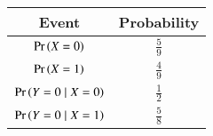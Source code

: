 
\begin{center}
    \begin{tabular}{|c|c|}
    \hline
    \textbf{Event}& \textbf{Probability} \\ \hline
    $\Pr\left(X = 0\right)$ & 	$\frac{5}{9}$ \\ \hline
    $\Pr\left(X = 1\right)$ & 	$\frac{4}{9}$ \\ \hline
    $\Pr\left(Y = 0 \mid X = 0\right)$ &  $\frac{1}{2}$ \\ \hline
    $\Pr\left(Y = 0 \mid X = 1\right)$ &  $\frac{5}{8}$ \\ \hline
    \end{tabular}
    \end{center}

